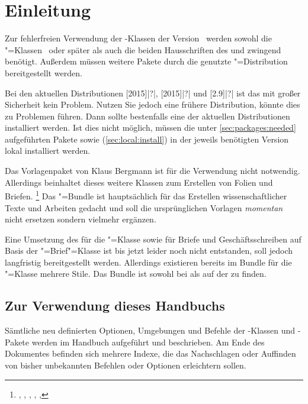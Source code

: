 \chapter{Einleitung}
%
Zur fehlerfreien Verwendung der \TUDScript-Klassen der Version~\vTUDScript{} 
werden sowohl die \KOMAScript"=Klassen~\vKOMAScript{} oder später als auch die 
beiden Hausschriften des \CDs \Univers und \DIN zwingend benötigt. Außerdem 
müssen weitere Pakete durch die genutzte "=Distribution 
bereitgestellt werden. 

Bei den aktuellen Distributionen
%
[2015]|?|,
[2015]|?| und 
[2.9]|?|
ist das mit großer Sicherheit kein Problem. Nutzen Sie jedoch eine frühere 
Distribution, könnte dies zu Problemen führen. Dann sollte bestenfalls eine der 
aktuellen Distributionen installiert werden. Ist dies nicht möglich, müssen die 
unter \autoref{sec:packages:needed} aufgeführten Pakete sowie \TUDScript 
(\autoref{sec:local:install}) in der jeweils benötigten Version lokal 
installiert werden.

Das Vorlagenpaket von Klaus Bergmann ist für die Verwendung nicht notwendig. 
Allerdings beinhaltet dieses weitere Klassen zum Erstellen von Folien 
und Briefen.%
\footnote{%
  , , , , 
  , 
}
Das \TUDScript"=Bundle ist hauptsächlich für das Erstellen wissenschaftlicher 
Texte und Arbeiten gedacht und soll die ursprünglichen Vorlagen \emph{momentan} 
nicht ersetzen sondern vielmehr ergänzen. 

Eine Umsetzung des \CDs für die "=Klasse sowie für Briefe und 
Geschäftsschreiben auf Basis der \KOMAScript"=Brief"=Klasse  
ist bis jetzt leider noch nicht entstanden, soll jedoch langfristig 
bereitgestellt werden. Allerdings existieren bereits im Bundle 
 für die "=Klasse mehrere Stile. Das Bundle 
ist sowohl bei  als auf der 
 zu 
finden.



\section{Zur Verwendung dieses Handbuchs}
Sämtliche neu definierten Optionen, Umgebungen und Befehle der 
\TUDScript-Klassen und \TUDScript-Pakete werden im Handbuch aufgeführt und 
beschrieben. Am Ende des Dokumentes befinden sich mehrere Indexe, die das 
Nachschlagen oder Auffinden von bisher unbekannten Befehlen oder Optionen 
erleichtern sollen.

